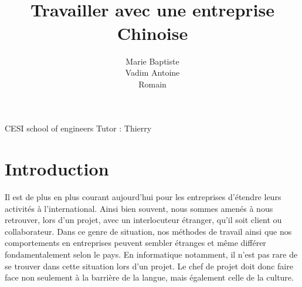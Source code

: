 \documentclass{article}
\begin{document}
\begin{titlepage}
\begin{figure}
\end{figure}

\title{ \\ \vspace{2cm} \bf{\color{title-color}\robotoslab Travailler avec une entreprise Chinoise} \vspace{1cm} \\
}
\begin{figure}
\end{figure}
\author{\Large{Marie } \Large{Baptiste  } \\\Large{Vadim  } \Large{Antoine  } \\\Large{Romain  }}
\date{}
\vfill 
\end{titlepage}
\maketitle
\vspace{\fill}
\Large{CESI school of engineers} \hfill \Large{Tutor : Thierry }
\thispagestyle{empty}
\setcounter{page}{0}
\newpage

\renewcommand{\contentsname}{Table of contents}
\tableofcontents

\newpage

\newcommand{\projectname}{ChineseTooth\xspace}
\newcommand{\companyname}{Cesi conseil\xspace}
\newcommand{\moldco}{MOLD \& Co.\xspace}

\section{Introduction}
Il est de plus en plus courant aujourd'hui pour les entreprises d'étendre leurs activités à l'international. Ainsi bien souvent, nous sommes amenés à nous retrouver, lors d'un projet, avec un interlocuteur étranger, qu'il soit client ou collaborateur.
Dans ce genre de situation, nos méthodes de travail ainsi que nos comportements en entreprises peuvent sembler étranges et même différer fondamentalement selon le pays.
En informatique notamment, il n'est pas rare de se trouver dans cette situation lors d'un projet. Le chef de projet doit donc faire face non seulement à la barrière de la langue, mais également celle de la culture.
\end{document}

